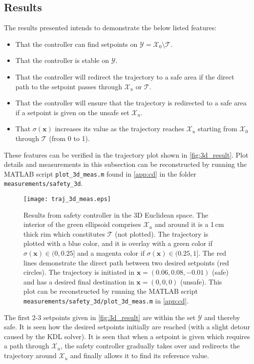 \subsection{Results}
The results presented intends to demonstrate the below listed features:
\vspace{-3mm}
\begin{itemize}
	\itemsep-0.6mm
\item That the controller can find setpoints on $\mathcal{Y}=\mathcal{X}_0\setminus\mathcal{T}$.
\item That the controller is stable on $\mathcal{Y}$.
\item That the controller will redirect the trajectory to a safe area if the direct path to the setpoint passes through $\mathcal{X}_u$ or $\mathcal{T}$.
\item That the controller will ensure that the trajectory is redirected to a safe area if a setpoint is given on the unsafe set $\mathcal{X}_u$.
\item That $\sigma (\textbf{x})$ increases its value as the trajectory reaches $\mathcal{X}_u$ starting from $\mathcal{X}_0$ through $\mathcal{T}$ (from 0 to 1).
\end{itemize}
These features can be verified in the trajectory plot shown in \autoref{fig:3d_result}. Plot details and measurements in this subsection can be reconstructed by running the MATLAB script \texttt{plot\_3d\_meas.m} found in \autoref{app:cd} in the folder \texttt{measurements/safety\_3d}.
\begin{figure}[H]
\hspace{-45mm}
	\texttt{[image: traj\_3d\_meas.eps]}
	\caption{Results from safety controller in the 3D Euclidean space. The interior of the green ellipsoid comprises $\mathcal{X}_u$ and around it is a 1\,cm thick rim which constitutes $\mathcal{T}$ (not plotted). The trajectory is plotted with a blue color, and it is overlay with a green color if $\sigma(\textbf{x}) \in (0,0.25]$ and a magenta color if $\sigma(\textbf{x}) \in (0.25,1]$. The red lines demonstrate the direct path between two desired setpoints (red circles). The trajectory is initiated in $\mathbf{x}=(0.06,0.08,-0.01)$ (safe) and has a desired final destination in $\mathbf{x}=(0,0,0)$ (unsafe). This plot can be reconstructed by running the MATLAB script \texttt{measurements/safety\_3d/plot\_3d\_meas.m} in \autoref{app:cd}.}
	\label{fig:3d_result}
\end{figure}
The first 2-3 setpoints given in \autoref{fig:3d_result} are within the set $\mathcal{Y}$ and thereby safe. It is seen how the desired setpoints initially are reached (with a slight detour caused by the KDL solver). It is seen that when a setpoint is given which requires a path through $\mathcal{X}_u$, the safety controller gradually takes over and redirects the trajectory around $\mathcal{X}_u$ and finally allows it to find its reference value. 

